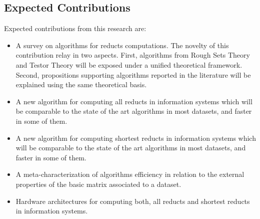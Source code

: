 \documentclass[authoryear,11pt]{elsarticle}
\begin{document}
\subsection{Expected Contributions}\label{Contributions} 
  Expected contributions from this research are:
  \begin{itemize}
  \item A survey on algorithms for reducts computations. The novelty of this contribution relay in two
  		aspects. First, algorithms from Rough Sets Theory and Testor Theory will be exposed under a 
  		unified theoretical framework. Second, propositions supporting algorithms reported in the literature will
  		be explained using the same theoretical basis. 
  \item A new algorithm for computing all reducts in information systems which will be comparable to the 
  		state of the art algorithms in most datasets, and faster in some of them.
  \item A new algorithm for computing shortest reducts in information systems which will be comparable to the 
  		state of the art algorithms in most datasets, and faster in some of them.
  \item A meta-characterization of algorithms efficiency in relation to the external properties of the
  		basic matrix associated to a dataset.
  \item Hardware architectures for computing both, all reducts and shortest reducts in information systems.
  \end{itemize}
\end{document}
